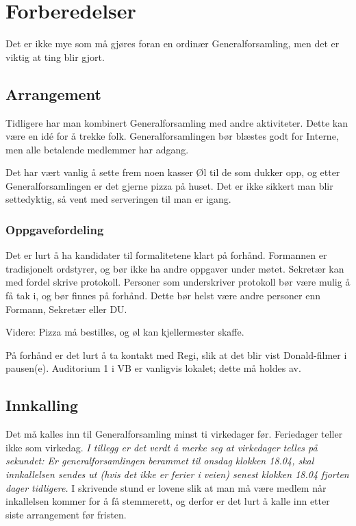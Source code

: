 
\section{Forberedelser}
Det er ikke mye som må gjøres foran en ordinær Generalforsamling, men det er
viktig at ting blir gjort.

\subsection{Arrangement}
Tidligere har man kombinert Generalforsamling med andre aktiviteter. Dette kan 
være en idé for å trekke folk. Generalforsamlingen bør blæstes godt for Interne,
men alle betalende medlemmer har adgang.

Det har vært vanlig å sette frem noen kasser Øl til de som dukker opp, og etter
Generalforsamlingen er det gjerne pizza på huset. Det er ikke sikkert man blir
settedyktig, så vent med serveringen til man er igang.

\subsubsection{Oppgavefordeling}
Det er lurt å ha kandidater til formalitetene klart på forhånd. Formannen er
tradisjonelt ordstyrer, og bør ikke ha andre oppgaver under møtet. Sekretær
kan med fordel skrive protokoll. Personer som underskriver protokoll bør være
mulig å få tak i, og bør finnes på forhånd. Dette bør helst være andre personer
enn Formann, Sekretær eller DU.

Videre: Pizza må bestilles, og øl kan kjellermester skaffe.

På forhånd er det lurt å ta kontakt med Regi, slik at det blir vist Donald-filmer
i pausen(e). Auditorium 1 i VB er vanligvis lokalet; dette må holdes av.

\subsection{Innkalling}
Det må kalles inn til Generalforsamling minst ti virkedager før. Feriedager teller
ikke som virkedag. \emph{I tillegg er det verdt å merke seg at virkedager telles på sekundet:
Er generalforsamlingen berammet til onsdag klokken 18.04, skal innkallelsen sendes ut
(hvis det ikke er ferier i veien) senest klokken 18.04 fjorten dager tidligere.} I skrivende
stund er lovene slik at man må være medlem når inkallelsen kommer for å få stemmerett, og derfor
er det lurt å kalle inn etter siste arrangement før fristen.

